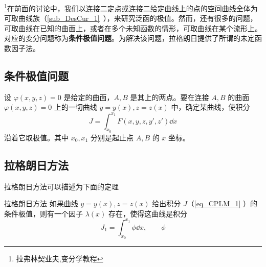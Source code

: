 
\footnote{拉弗林契业夫,变分学教程}在前面的讨论中，我们以连接二定点或连接二给定曲线上的点的空间曲线全体为可取曲线族（\autoref{sub_DesCur_1}~），来研究泛函的极值。然而，还有很多的问题，可取曲线在已知的曲面上，或者在多个未知函数的情形，可取曲线在某个流形上。对应的变分问题称为\textbf{条件极值问题}。为解决该问题，拉格朗日提供了所谓的未定函数因子法。
\subsection{条件极值问题}
设 $\varphi(x,y,z)=0$ 是给定的曲面，$A,B$ 是其上的两点。要在连接 $A,B$ 的曲面$\varphi(x,y,z)=0$ 上的一切曲线 $y=y(x),z=z(x)$ 中，确定某曲线，使积分
\begin{equation}\label{eq_CPLM_1}
J=\int_{x_0}^{x_1}F(x,y,z,y',z')\dd x
\end{equation}
沿着它取极值。其中 $x_0,x_1$ 分别是起止点 $A,B$ 的 $x$ 坐标。
\subsection{拉格朗日方法}
拉格朗日方法可以描述为下面的定理
\begin{theorem}{拉格朗日方法}
如果曲线 $y=y(x),z=z(x)$ 给出积分 $J$（\autoref{eq_CPLM_1} ）的条件极值，则有一个因子 $\lambda(x)$ 存在，使得这曲线是积分
\begin{equation}
J_1=\int_{x_0}^{x_1}\phi \dd x,\qquad \phi
\end{equation}

\end{theorem}